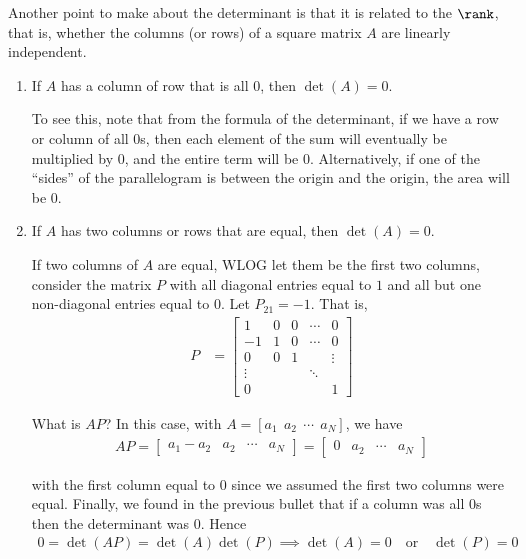 \documentclass{article}
\begin{document}
Another point to make about the determinant is that it is related to the $\rank$, that is, whether the columns (or rows) of a square matrix $A$ are linearly independent.
\begin{enumerate}
  \item If $A$ has a column of row that is all $0$, then $\det(A) = 0$.

    To see this, note that from the formula of the determinant, if we have a row or column of all $0$s, then each element of the sum will eventually be multiplied by $0$, and the entire term will be $0$. Alternatively, if one of the ``sides'' of the parallelogram is between the origin and the origin, the area will be $0$.

  \item If $A$ has two columns or rows that are equal, then $\det(A) = 0$.

    If two columns of $A$ are equal, WLOG let them be the first two columns, consider the matrix $P$ with all diagonal entries equal to $1$ and all but one non-diagonal entries equal to $0$. Let $P_{21} = -1$. That is,
    \begin{align*}
      P
      &
      =
      \begin{bmatrix}
        1      & 0 & 0 & \cdots & 0 \\
        -1     & 1 & 0 & \cdots & 0 \\
        0      & 0 & 1 &        & \vdots \\
        \vdots &   &   & \ddots &   \\
        0      &   &   &        & 1
      \end{bmatrix}
    \end{align*}

    What is $A P$? In this case, with $A = [a_1 ~~ a_2 ~~ \cdots ~~ a_N]$, we have
    \begin{align*}
      A P
      =
      \begin{bmatrix}
        a_1 - a_2 & a_2 & \cdots & a_N
      \end{bmatrix}
      =
      \begin{bmatrix}
        0 & a_2 & \cdots & a_N
      \end{bmatrix}
    \end{align*}

    with the first column equal to $0$ since we assumed the first two columns were equal. Finally, we found in the previous bullet that if a column was all $0$s then the determinant was $0$. Hence
    \begin{align*}
      0
      =
      \det(A P)
      =
      \det(A) \det(P)
      \implies
      \det(A) = 0 \quad\text{or}\quad \det(P) = 0
    \end{align*}


\end{enumerate}
\end{document}
